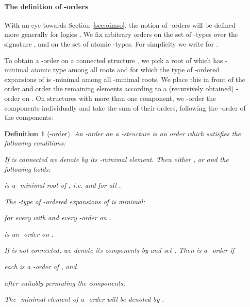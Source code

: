 \documentclass[11pt]{article}
\newtheorem{definition}{Definition}
\begin{document}
\paragraph{The definition of -orders}

With an eye towards Section~\ref{sec:oimso}, the notion of -orders
will be defined more generally for logics . We fix arbitrary orders  on the
set of -types over the signature , and
 on the set of atomic -types. For
simplicity we write  for .

To obtain a -order  on a connected structure , we pick a root  of  which has
-minimal atomic type among all roots and for
which the type of -ordered expansions of  is
-minimal among all
-minimal roots. We place this  in front of
the order  and order the remaining elements according to a
(recursively obtained) -order on . On structures with
more than one component, we -order the components individually and
take the sum of their orders, following the -order of
the components:

\begin{definition}[-order]
  \label{def:q-order}
  An \emph{-order} on a -structure  is an
  order  which satisfies the following conditions:
  \begin{conditions}
  \item\label{def:q-order-connected} If  is connected we denote
    by  its -minimal element. Then either
    , or  and the following holds:
    \begin{conditions}
    \item \label{def:q-orders-min-element-is-root}  is a
      -minimal root of , i.e.  and  for all .
    \item \label{def:q-orders-root-q-type} The -type of
      -ordered expansions of  is minimal:
      
      for every  with 
      and every -order  on .
    \item\label{def:q-order-connected-restriction}
       is an -order on
      .
    \end{conditions}
  \item\label{def:q-order-disconnected} If  is not connected, we
    denote its components by  and set
    . Then  is a -order
    if
    \begin{conditions}
    \item each  is a -order of , and
    \item after suitably permuting the components,
      
    \end{conditions}
  \end{conditions}
  The -minimal element of a -order  will be
  denoted by .
\end{definition}
\end{document}
